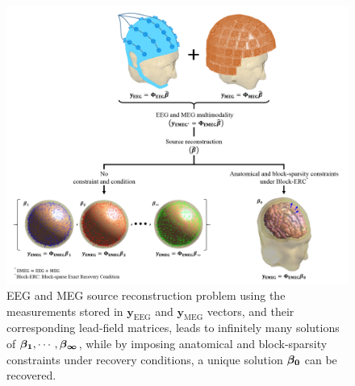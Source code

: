 \begin{figure}%
\centering
\includegraphics[width=1\textwidth]{images/Anatomical-sparsity-constraints.png} %
\caption{EEG and MEG source reconstruction problem using the measurements stored in $\boldsymbol{y_{\mathrm{EEG}}}$ and $\boldsymbol{y_{\mathrm{MEG}}}$ vectors, and their corresponding lead-field matrices, leads to infinitely many solutions of $\boldsymbol{\beta}_{\boldsymbol{1}}, \cdots, \boldsymbol{\beta}_{\boldsymbol{\infty}}$, while by imposing anatomical and block-sparsity constraints under recovery conditions, a unique solution $\boldsymbol{\beta}_{\boldsymbol{0}}$ can be recovered.}
\label{fig:Anatomical-sparsity-constraints}
\end{figure}